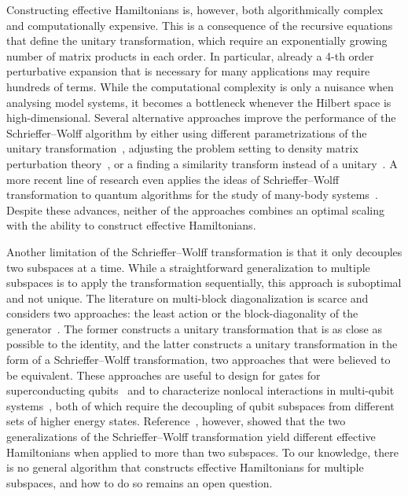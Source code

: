 Constructing effective Hamiltonians is, however, both algorithmically complex and computationally expensive.
This is a consequence of the recursive equations that define the unitary transformation, which require an exponentially growing number of matrix products in each order.
In particular, already a 4-th order perturbative expansion that is necessary for many applications may require hundreds of terms.
While the computational complexity is only a nuisance when analysing model systems, it becomes a bottleneck whenever the Hilbert space is high-dimensional.
Several alternative approaches improve the performance of the Schrieffer--Wolff algorithm by either using different parametrizations of the unitary transformation~\cite{Van_Vleck_1929, Shavitt_1980, Lowdin_1962, Klein_1974, Suzuki_1983}, adjusting the problem setting to density matrix perturbation theory~\cite{McWeeny_1962, Truflandier_2020}, or a finding a similarity transform instead of a unitary~\cite{Bloch_1958}.
A more recent line of research even applies the ideas of Schrieffer--Wolff transformation to quantum algorithms for the study of many-body systems~\cite{Wurtz_2020, Zhang_2022}.
Despite these advances, neither of the approaches combines an optimal scaling with the ability to construct effective Hamiltonians.

Another limitation of the Schrieffer--Wolff transformation is that it only decouples two subspaces at a time.
While a straightforward generalization to multiple subspaces is to apply the transformation sequentially, this approach is suboptimal and not unique.
The literature on multi-block diagonalization is scarce and considers two approaches: the least action or the block-diagonality of the generator~\cite{Mankodi_2024}.
The former constructs a unitary transformation that is as close as possible to the identity, and the latter constructs a unitary transformation in the form of a Schrieffer--Wolff transformation, two approaches that were believed to be equivalent.
These approaches are useful to design for gates for superconducting qubits~\cite{Magesan_2020} and to characterize nonlocal interactions in multi-qubit systems~\cite{Xu_2024}, both of which require the decoupling of qubit subspaces from different sets of higher energy states.
Reference~\cite{Mankodi_2024}, however, showed that the two generalizations of the Schrieffer--Wolff transformation yield different effective Hamiltonians when applied to more than two subspaces.
To our knowledge, there is no general algorithm that constructs effective Hamiltonians for multiple subspaces, and how to do so remains an open question.

